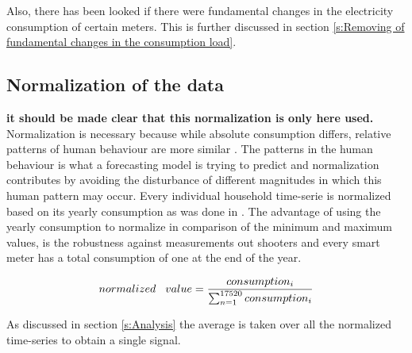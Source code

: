 

Also, there has been looked if there were fundamental changes in the electricity consumption of certain meters. This is further discussed in section \ref{s:Removing of fundamental changes in the consumption load}.


\subsection{Normalization of the data}
\label{s:Normalization of the data}
\textbf{it should be made clear that this normalization is only here used.}
Normalization is necessary because while absolute consumption differs, relative patterns of human behaviour are more similar \cite{Lago2020}. The patterns in the human behaviour is what a forecasting model is trying to predict and normalization contributes by avoiding the disturbance of different magnitudes in which this human pattern may occur. Every individual household time-serie is normalized based on its yearly consumption as was done in \cite{Lago2020}. The advantage of using the yearly consumption to normalize in comparison of the minimum and maximum values, is the robustness against measurements out shooters and every smart meter has a total consumption of one at the end of the year.

\begin{equation}\label{eq:norm}
	normalized\hspace{0.3cm} value = \frac{consumption_i}{\sum_{n=1}^{17520} consumption_i}
\end{equation} 

As discussed in section \ref{s:Analysis} the average is taken over all the normalized time-series to obtain a single signal.  


